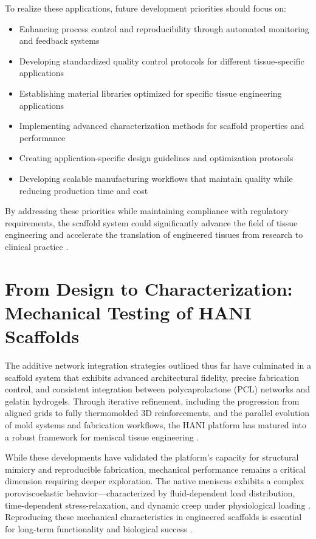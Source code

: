 To realize these applications, future development priorities should focus on:
\begin{itemize}
    \item Enhancing process control and reproducibility through automated monitoring and feedback systems
    \item Developing standardized quality control protocols for different tissue-specific applications
    \item Establishing material libraries optimized for specific tissue engineering applications
    \item Implementing advanced characterization methods for scaffold properties and performance
    \item Creating application-specific design guidelines and optimization protocols
    \item Developing scalable manufacturing workflows that maintain quality while reducing production time and cost
\end{itemize}

By addressing these priorities while maintaining compliance with regulatory requirements, the scaffold system could significantly advance the field of tissue engineering and accelerate the translation of engineered tissues from research to clinical practice \cite{jin2022applicationsprospects, garreta2017tissueengineering, chae20213dcellprinting, makris2011kneemeniscus}.

\section{From Design to Characterization: \protect\\Mechanical Testing of HANI Scaffolds}

The additive network integration strategies outlined thus far have culminated in a scaffold system that exhibits advanced architectural fidelity, precise fabrication control, and consistent integration between polycaprolactone (PCL) networks and gelatin hydrogels. Through iterative refinement, including the progression from aligned grids to fully thermomolded 3D reinforcements, and the parallel evolution of mold systems and fabrication workflows, the HANI platform has matured into a robust framework for meniscal tissue engineering \cite{elkommos2025hybridhydrogels, a.murphy20243dprintedvariable, chae20213dcellprinting}.

While these developments have validated the platform's capacity for structural mimicry and reproducible fabrication, mechanical performance remains a critical dimension requiring deeper exploration. The native meniscus exhibits a complex poroviscoelastic behavior—characterized by fluid-dependent load distribution, time-dependent stress-relaxation, and dynamic creep under physiological loading \cite{ateshian1997finitedeformation, ateshian2015patientspecificarticular, chandran2004microstructuralmechanics}. Reproducing these mechanical characteristics in engineered scaffolds is essential for long-term functionality and biological success \cite{patel2019systematicreview, xiao2013mechanicaltesting, makris2011kneemeniscus}.

